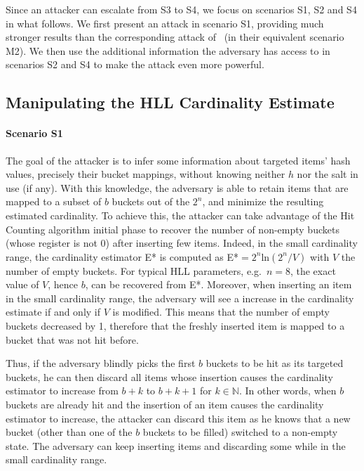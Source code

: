 \documentclass[11pt]{article}
\begin{document}
Since an attacker can escalate from S3 to S4, we focus on scenarios S1, S2 and S4 in what follows. We first present an attack in scenario S1, providing much stronger results than the corresponding attack of~\cite{hllvuln} (in their equivalent scenario M2). We then use the additional information the adversary has access to in scenarios S2 and S4 to make the attack even more powerful.

\subsection{Manipulating the HLL Cardinality Estimate}
\noindent\paragraph{Scenario S1} The goal of the attacker is to infer some information about targeted items' hash values, precisely their bucket mappings, without knowing neither $h$ nor the salt in use (if any). With this knowledge, the adversary is able to retain items that are mapped to a subset of $b$ buckets out of the $2^n$, and minimize the resulting estimated cardinality. To achieve this, the attacker can take advantage of the Hit Counting algorithm initial phase to recover the number of non-empty buckets (whose register is not 0) after inserting few items. Indeed, in the small cardinality range, the cardinality estimator E* is computed as E*$=2^n$ln$(2^n/V)$ with $V$ the number of empty buckets. For typical HLL parameters, e.g.\ $n = 8$, the exact value of $V$, hence $b$, can be recovered from E*. Moreover, when inserting an item in the small cardinality range, the adversary will see a increase in the cardinality estimate if and only if $V$ is modified. This means that the number of empty buckets decreased by 1, therefore that the freshly inserted item is mapped to a bucket that was not hit before. 

Thus, if the adversary blindly picks the first $b$ buckets to be hit as its targeted buckets, he can then discard all items whose insertion causes the cardinality estimator to increase from $b+k$ to $b+k+1$ for $k \in \mathbb{N}$. In other words, when $b$ buckets are already hit and the insertion of an item causes the cardinality estimator to increase, the attacker can discard this item as he knows that a new bucket (other than one of the $b$ buckets to be filled) switched to a non-empty state. The adversary can keep inserting items and discarding some while in the small cardinality range.
\end{document}
